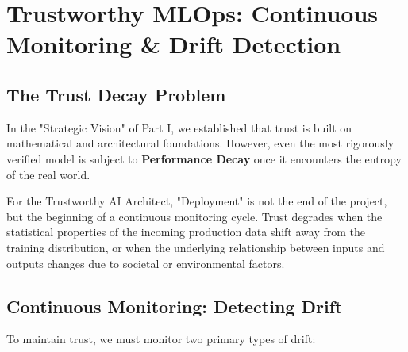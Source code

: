 
\chapter{Trustworthy MLOps: Continuous Monitoring \& Drift Detection}
\label{chap:mlops_monitoring}


\section{The Trust Decay Problem}
\label{sec:trust_decay}

In the "Strategic Vision" of Part I, we established that trust is built on mathematical and architectural foundations. However, even the most rigorously verified model is subject to \textbf{Performance Decay} once it encounters the entropy of the real world. 

For the Trustworthy AI Architect, "Deployment" is not the end of the project, but the beginning of a continuous monitoring cycle. Trust degrades when the statistical properties of the incoming production data shift away from the training distribution, or when the underlying relationship between inputs and outputs changes due to societal or environmental factors.

\section{Continuous Monitoring: Detecting Drift}
\label{sec:drift_detection}

To maintain trust, we must monitor two primary types of drift:

